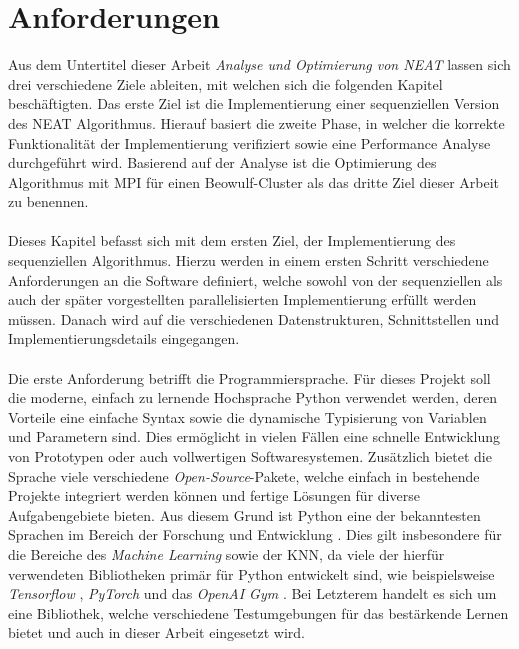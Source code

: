 \section{Anforderungen}
\label{sec:requirements}
Aus dem Untertitel dieser Arbeit \emph{Analyse und Optimierung von \ac{NEAT}} lassen sich drei verschiedene Ziele ableiten, mit welchen sich die folgenden Kapitel beschäftigten. Das erste Ziel ist die Implementierung einer sequenziellen Version des \ac{NEAT} Algorithmus. Hierauf basiert die zweite Phase, in welcher die korrekte Funktionalität der Implementierung verifiziert sowie eine Performance Analyse durchgeführt wird. Basierend auf der Analyse ist die Optimierung des Algorithmus mit \ac{MPI} für einen Beowulf-Cluster als das dritte Ziel dieser Arbeit zu benennen.
\\\\
Dieses Kapitel befasst sich mit dem ersten Ziel, der Implementierung des sequenziellen Algorithmus. Hierzu werden in einem ersten Schritt verschiedene Anforderungen an die Software definiert, welche sowohl von der sequenziellen als auch der später vorgestellten parallelisierten Implementierung erfüllt werden müssen. Danach wird auf die verschiedenen Datenstrukturen, Schnittstellen und Implementierungsdetails eingegangen.
\\\\
Die erste Anforderung betrifft die Programmiersprache. Für dieses Projekt soll die moderne, einfach zu lernende Hochsprache Python verwendet werden, deren \newpage \noindent Vorteile eine einfache Syntax sowie die dynamische Typisierung von Variablen und Parametern sind. Dies ermöglicht in vielen Fällen eine schnelle Entwicklung von Prototypen oder auch vollwertigen Softwaresystemen. Zusätzlich bietet die Sprache viele verschiedene \emph{Open-Source}-Pakete, welche einfach in bestehende Projekte integriert werden können und fertige Lösungen für diverse Aufgabengebiete bieten. Aus diesem Grund ist Python eine der bekanntesten Sprachen im Bereich der Forschung und Entwicklung \cite{dalcin2011parallel}. Dies gilt insbesondere für die Bereiche des \emph{Machine Learning} sowie der \ac{KNN}, da viele der hierfür verwendeten Bibliotheken primär für Python entwickelt sind, wie beispielsweise \emph{Tensorflow} \cite{tensorflow2015}, \emph{PyTorch} \cite{pytorch2019} und das \emph{OpenAI Gym} \cite{OpenAiGym2016}. Bei Letzterem handelt es sich um eine Bibliothek, welche verschiedene Testumgebungen für das bestärkende Lernen bietet und auch in dieser Arbeit eingesetzt wird.  
\\\\
